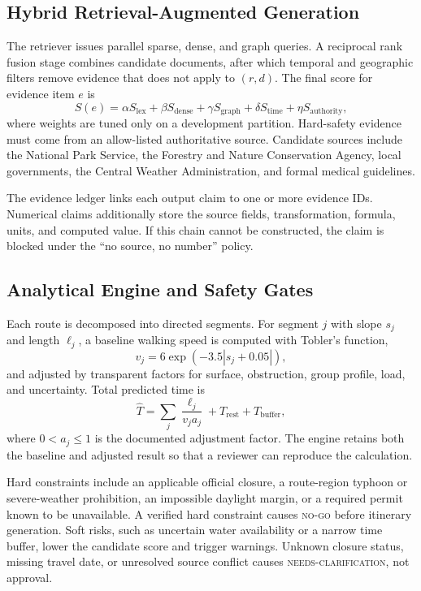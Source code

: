 \documentclass[conference]{IEEEtran}
\begin{document}
\subsection{Hybrid Retrieval-Augmented Generation}
The retriever issues parallel sparse, dense, and graph queries. A reciprocal
rank fusion stage combines candidate documents, after which temporal and
geographic filters remove evidence that does not apply to $(r,d)$. The final
score for evidence item $e$ is
\begin{equation}
S(e)=\alpha S_{\mathrm{lex}}+\beta S_{\mathrm{dense}}+
\gamma S_{\mathrm{graph}}+\delta S_{\mathrm{time}}+
\eta S_{\mathrm{authority}},
\label{eq:retrieval}
\end{equation}
where weights are tuned only on a development partition. Hard-safety evidence
must come from an allow-listed authoritative source. Candidate sources include
the National Park Service, the Forestry and Nature Conservation Agency,
local governments, the Central Weather Administration, and formal medical
guidelines.

The evidence ledger links each output claim to one or more evidence IDs.
Numerical claims additionally store the source fields, transformation,
formula, units, and computed value. If this chain cannot be constructed, the
claim is blocked under the ``no source, no number'' policy.

\subsection{Analytical Engine and Safety Gates}
Each route is decomposed into directed segments. For segment $j$ with slope
$s_j$ and length $\ell_j$, a baseline walking speed is computed with Tobler's
function,
\begin{equation}
v_j=6\exp(-3.5|s_j+0.05|),
\end{equation}
and adjusted by transparent factors for surface, obstruction, group profile,
load, and uncertainty. Total predicted time is
\begin{equation}
\hat{T}=\sum_j\frac{\ell_j}{v_j a_j}+T_{\mathrm{rest}}+T_{\mathrm{buffer}},
\label{eq:time}
\end{equation}
where $0<a_j\leq1$ is the documented adjustment factor. The engine retains
both the baseline and adjusted result so that a reviewer can reproduce the
calculation.

Hard constraints include an applicable official closure, a route-region
typhoon or severe-weather prohibition, an impossible daylight margin, or a
required permit known to be unavailable. A verified hard constraint causes
\textsc{no-go} before itinerary generation. Soft risks, such as uncertain
water availability or a narrow time buffer, lower the candidate score and
trigger warnings. Unknown closure status, missing travel date, or unresolved
source conflict causes \textsc{needs-clarification}, not approval.
\end{document}
